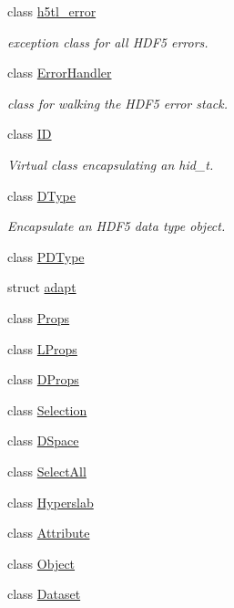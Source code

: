 \begin{DoxyCompactItemize}
\item 
class \hyperlink{class_h5_t_l_1_1h5tl__error}{h5tl\-\_\-error}
\begin{DoxyCompactList}\small\item\em exception class for all H\-D\-F5 errors. \end{DoxyCompactList}\item 
class \hyperlink{class_h5_t_l_1_1_error_handler}{Error\-Handler}
\begin{DoxyCompactList}\small\item\em class for walking the H\-D\-F5 error stack. \end{DoxyCompactList}\item 
class \hyperlink{class_h5_t_l_1_1_i_d}{I\-D}
\begin{DoxyCompactList}\small\item\em Virtual class encapsulating an hid\-\_\-t. \end{DoxyCompactList}\item 
class \hyperlink{class_h5_t_l_1_1_d_type}{D\-Type}
\begin{DoxyCompactList}\small\item\em Encapsulate an H\-D\-F5 data type object. \end{DoxyCompactList}\item 
class \hyperlink{class_h5_t_l_1_1_p_d_type}{P\-D\-Type}
\item 
struct \hyperlink{struct_h5_t_l_1_1adapt}{adapt}
\item 
class \hyperlink{class_h5_t_l_1_1_props}{Props}
\item 
class \hyperlink{class_h5_t_l_1_1_l_props}{L\-Props}
\item 
class \hyperlink{class_h5_t_l_1_1_d_props}{D\-Props}
\item 
class \hyperlink{class_h5_t_l_1_1_selection}{Selection}
\item 
class \hyperlink{class_h5_t_l_1_1_d_space}{D\-Space}
\item 
class \hyperlink{class_h5_t_l_1_1_select_all}{Select\-All}
\item 
class \hyperlink{class_h5_t_l_1_1_hyperslab}{Hyperslab}
\item 
class \hyperlink{class_h5_t_l_1_1_attribute}{Attribute}
\item 
class \hyperlink{class_h5_t_l_1_1_object}{Object}
\item 
class \hyperlink{class_h5_t_l_1_1_dataset}{Dataset}
\item 

\end{DoxyCompactItemize}
